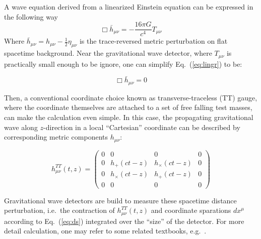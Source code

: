  
A wave equation derived from a linearized Einstein equation can be expressed in the following way
\begin{equation}
\label{eq:lingr}
    \Box \bar{h}_{\mu\nu} = - \frac{16\pi G}{c^4}T_{\mu\nu}
\end{equation}
Where $\bar{h}_{\mu\nu} = h_{\mu\nu}-\frac{1}{2}\eta_{\mu\nu}$ is the trace-reversed metric perturbation on flat spacetime background. Near the gravitational wave detector, where $T_{\mu\nu}$ is practically small enough to be ignore, one can simplify Eq.~(\ref{eq:lingr}) to be:

\begin{equation}
\label{eq:lingr0}
    \Box \bar{h}_{\mu\nu} = 0
\end{equation}

Then, a conventional coordinate choice known as transverse-traceless (TT) gauge, where the coordinate themselves are attached to a set of free falling test masses, can make the calculation even simple. In this case, the propagating gravitational wave along $z$-direction in a local ``Cartesian'' coordinate can be described by corresponding metric components $h_{\mu\nu}$:

\begin{equation}
\label{eq:hphx}
    h^{TT}_{\mu\nu}(t,z) = 
\left(
\begin{array}{cccc}
    0 & 0 &0 & 0  \\
    0 & h_{+}(ct-z) & h_{\times}(ct-z) & 0  \\
    0 & h_{\times}(ct-z) & h_{+}(ct-z) & 0  \\
    0 & 0 &0 & 0  
\end{array}
\right) 
\end{equation}


Gravitational wave detectors are build to measure these spacetime distance perturbation, i.e.~the contraction of $h^{TT}_{\mu\nu}(t,z)$ and coordinate sparations $dx^{\mu}$ according to Eq.~(\ref{eq:ds}) integrated over the ``size'' of the detector.
For more detail calculation, one may refer to some related textbooks, e.g.~\cite{maggiore:gw1}.



